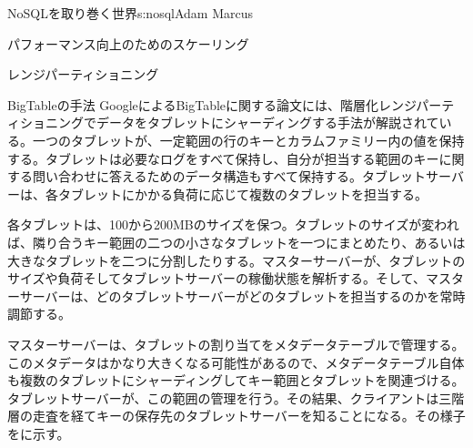 \begin{aosachapter}{NoSQLを取り巻く世界}{s:nosql}{Adam Marcus}
\begin{aosasect1}{パフォーマンス向上のためのスケーリング}
\begin{aosasect2}{レンジパーティショニング}
\begin{aosasect3}{BigTableの手法}
GoogleによるBigTableに関する論文には、階層化レンジパーティショニングでデータをタブレットにシャーディングする手法が解説されている。一つのタブレットが、一定範囲の行のキーとカラムファミリー内の値を保持する。タブレットは必要なログをすべて保持し、自分が担当する範囲のキーに関する問い合わせに答えるためのデータ構造もすべて保持する。タブレットサーバーは、各タブレットにかかる負荷に応じて複数のタブレットを担当する。

各タブレットは、100から200MBのサイズを保つ。タブレットのサイズが変われば、隣り合うキー範囲の二つの小さなタブレットを一つにまとめたり、あるいは大きなタブレットを二つに分割したりする。マスターサーバーが、タブレットのサイズや負荷そしてタブレットサーバーの稼働状態を解析する。そして、マスターサーバーは、どのタブレットサーバーがどのタブレットを担当するのかを常時調節する。


マスターサーバーは、タブレットの割り当てをメタデータテーブルで管理する。このメタデータはかなり大きくなる可能性があるので、メタデータテーブル自体も複数のタブレットにシャーディングしてキー範囲とタブレットを関連づける。タブレットサーバーが、この範囲の管理を行う。その結果、クライアントは三階層の走査を経てキーの保存先のタブレットサーバーを知ることになる。その様子をに示す。


\end{aosasect3}
\end{aosasect2}
\end{aosasect1}
\end{aosachapter}
